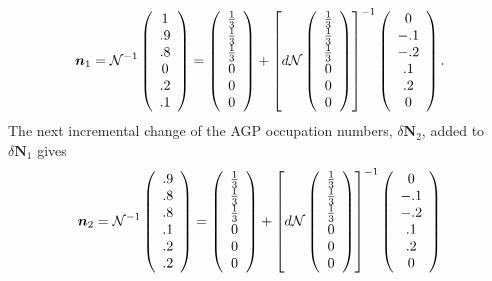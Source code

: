 \documentclass[aps,preprint]{revtex4}%
\begin{document}
\begin{equation}
\bm{n}_{1}=\mathcal{N}^{-1}\left(
\begin{array}
[c]{c}%
1\\
.9\\
.8\\
0\\
.2\\
.1
\end{array}
\right)  =\left(
\begin{array}
[c]{c}%
\frac{1}{3}\\
\frac{1}{3}\\
\frac{1}{3}\\
0\\
0\\
0
\end{array}
\right)  +\left[  d\mathcal{N}\left(
\begin{array}
[c]{c}%
\frac{1}{3}\\
\frac{1}{3}\\
\frac{1}{3}\\
0\\
0\\
0
\end{array}
\right)  \right]  ^{-1}\left(
\begin{array}
[c]{c}%
0\\
-.1\\
-.2\\
.1\\
.2\\
0
\end{array}
\right)  .
\end{equation}
The next incremental change of the AGP occupation numbers, $\delta\bm{N}_{2}$,
added to $\delta\bm{N}_{1}$ gives
\[
\bm{n}_{2}=\mathcal{N}^{-1}\left(
\begin{array}
[c]{c}%
.9\\
.8\\
.8\\
.1\\
.2\\
.2
\end{array}
\right)  =\left(
\begin{array}
[c]{c}%
\frac{1}{3}\\
\frac{1}{3}\\
\frac{1}{3}\\
0\\
0\\
0
\end{array}
\right)  +\left[  d\mathcal{N}\left(
\begin{array}
[c]{c}%
\frac{1}{3}\\
\frac{1}{3}\\
\frac{1}{3}\\
0\\
0\\
0
\end{array}
\right)  \right]  ^{-1}\left(
\begin{array}
[c]{c}%
0\\
-.1\\
-.2\\
.1\\
.2\\
0
\end{array}
\right)
\]%
\end{document}

